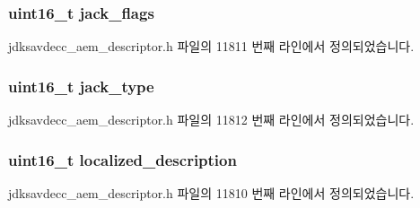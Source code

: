 \subsubsection[{\texorpdfstring{jack\+\_\+flags}{jack_flags}}]{\setlength{\rightskip}{0pt plus 5cm}uint16\+\_\+t jack\+\_\+flags}\hypertarget{structjdksavdecc__descriptor__jack_a000aef56fd1952d63d00e36f44c49d56}{}\label{structjdksavdecc__descriptor__jack_a000aef56fd1952d63d00e36f44c49d56}


jdksavdecc\+\_\+aem\+\_\+descriptor.\+h 파일의 11811 번째 라인에서 정의되었습니다.

\subsubsection[{\texorpdfstring{jack\+\_\+type}{jack_type}}]{\setlength{\rightskip}{0pt plus 5cm}uint16\+\_\+t jack\+\_\+type}\hypertarget{structjdksavdecc__descriptor__jack_afa0cc3c6946fb59ecf753ab5d0c04a7b}{}\label{structjdksavdecc__descriptor__jack_afa0cc3c6946fb59ecf753ab5d0c04a7b}


jdksavdecc\+\_\+aem\+\_\+descriptor.\+h 파일의 11812 번째 라인에서 정의되었습니다.

\subsubsection[{\texorpdfstring{localized\+\_\+description}{localized_description}}]{\setlength{\rightskip}{0pt plus 5cm}uint16\+\_\+t localized\+\_\+description}\hypertarget{structjdksavdecc__descriptor__jack_a0926f846ca65a83ad5bb06b4aff8f408}{}\label{structjdksavdecc__descriptor__jack_a0926f846ca65a83ad5bb06b4aff8f408}


jdksavdecc\+\_\+aem\+\_\+descriptor.\+h 파일의 11810 번째 라인에서 정의되었습니다.

